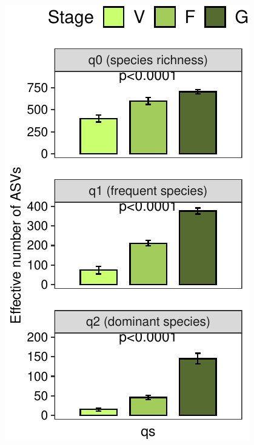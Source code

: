 \documentclass[]{interact}
\theoremstyle{plain}%
\theoremstyle{definition}
\theoremstyle{remark}
\begin{document}
\begin{center}\includegraphics{Doc_pdf_files/figure-latex/unnamed-chunk-32-1} \end{center}
\end{document}
